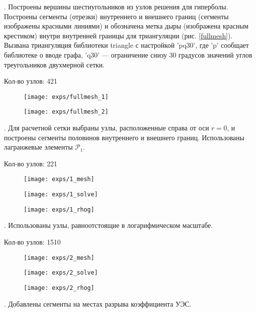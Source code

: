 
 \theexp \label{text_fullmesh}.
Построены вершины шестиугольников из узлов решения для гиперболы.
Построены сегменты (отрезки) внутреннего и внешнего границ (сегменты изображены красными линиями)
и обозначена метка дыры (изображена красным крестиком) внутри внутренней границы для триангуляции (рис. \ref{fullmesh}).
Вызвана триангуляция библиотеки triangle с настройкой 'pq30',
где 'p' сообщает библиотеке о вводе графа, 'q30' --- ограничение снизу 30 градусов значений углов треугольников двухмерной сетки.

Кол-во узлов: 421

\begin{figure}[H]
  \texttt{[image: exps/fullmesh\_1]}
\end{figure}
\begin{figure}[H]
  \texttt{[image: exps/fullmesh\_2]}
  \caption{} \label{fig_fullmesh}
\end{figure}

 \theexp.
Для расчетной сетки выбраны узлы, расположенные справа от оси $r = 0$,
и построены сегменты половинов внутреннего и внешнего границ.
Использованы лагранжевые элементы $\mathcal{P}_1$.

Кол-во узлов: 221

\begin{figure}[H]
  \texttt{[image: exps/1\_mesh]}
\end{figure}
\begin{figure}[H]
  \texttt{[image: exps/1\_solve]}
\end{figure}
\begin{figure}[H]
  \texttt{[image: exps/1\_rhog]}
\end{figure}

 \theexp.
Использованы узлы, равноотстоящие в логарифмическом масштабе.

Кол-во узлов: 1510

\begin{figure}[H]
  \texttt{[image: exps/2\_mesh]}
\end{figure}
\begin{figure}[H]
  \texttt{[image: exps/2\_solve]}
\end{figure}
\begin{figure}[H]
  \texttt{[image: exps/2\_rhog]}
\end{figure}

 \theexp.
Добавлены сегменты на местах разрыва коэффициента УЭС.

